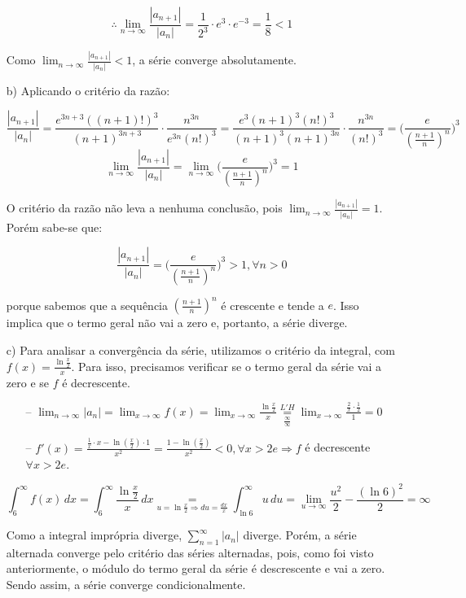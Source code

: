 \documentclass[12pt,a4paper]{article}
\begin{document}
\begin{itemize}
$$\therefore \lim_{n\rightarrow\infty} \frac{|a_{n+1}|}{|a_n|} = \frac{1}{2^3} \cdot e^3 \cdot e^{-3} = \frac{1}{8} < 1 $$

Como $\displaystyle\lim_{n\rightarrow\infty} \frac{|a_{n+1}|}{|a_n|} < 1$, a série converge absolutamente.

\item[b)] Aplicando o critério da razão:

$$ \frac{|a_{n+1}|}{|a_n|} =  \frac{e^{3n+3}((n+1)!)^3}{(n+1)^{3n+3}} \cdot  \frac{n^{3n}}{e^{3n} (n!)^3} =  \frac{e^{3}(n+1)^3 (n!)^3}{(n+1)^{3} (n+1)^{3n}} \cdot  \frac{n^{3n}}{ (n!)^3} = \Bigg( \frac{e}{(\frac{n+1}{n})^n} \Bigg)^3 $$
$$\lim_{n\rightarrow\infty} \frac{|a_{n+1}|}{|a_n|} = \lim_{n\rightarrow\infty} \Bigg( \frac{e}{(\frac{n+1}{n})^n} \Bigg)^3 = 1 $$

O critério da razão não leva a nenhuma conclusão, pois $\displaystyle\lim_{n\rightarrow\infty} \frac{|a_{n+1}|}{|a_n|} = 1 $. Porém sabe-se que:

$$ \frac{|a_{n+1}|}{|a_n|} = \Bigg( \frac{e}{(\frac{n+1}{n})^n} \Bigg)^3 > 1, \forall n > 0 $$

porque sabemos que a sequência $(\frac{n+1}{n})^n$ é crescente e tende a $e$. Isso implica que o termo geral não vai a zero e, portanto, a série diverge.

\item[c)] Para analisar a convergência da série, utilizamos o critério da integral, com $f(x) = \frac{\ln \frac{x}{2}}{x}$. Para isso, precisamos verificar se o termo geral da série vai a zero e se $f$ é decrescente.
    
    \begin{itemize}
    \item[--] $\displaystyle\lim_{n \rightarrow \infty} |a_n| = \lim_{x \rightarrow \infty} f(x) = \lim_{x \rightarrow \infty} \frac{\ln \frac{x}{2}}{x} \underset{\frac{\infty}{\infty}}{ \overset{L'H}{=}} \lim_{x \rightarrow \infty} \frac{\frac{2}{x} \cdot \frac{1}{2}}{1} = 0$
    \item[--] $f'(x) = \frac{\frac{1}{x} \cdot x - \ln(\frac{x}{2}) \cdot 1}{x^2} = \frac{1 - \ln(\frac{x}{2})}{x^2} < 0, \forall x > 2e  \Rightarrow f$ é decrescente $\forall x > 2e$.
    \end{itemize}
    
    $$ \int_{6}^\infty f(x) \, dx = \int_{6}^\infty \frac{\ln \frac{x}{2}}{x}  \, dx \underset{u = \ln \frac{x}{2} \Rightarrow du = \frac{dx}{x} }{=} \int_{\ln 6}^\infty u  \, du = \lim_{u\rightarrow\infty} \frac{u^2}{2} - \frac{(\ln 6)^2}{2} = \infty $$
    
    Como a integral imprópria diverge, $\displaystyle\sum_{n=1}^\infty |a_n|$ diverge. Porém, a série alternada converge pelo critério das séries alternadas, pois, como foi visto anteriormente, o módulo do termo geral da série é descrescente e vai a zero. Sendo assim, a série converge condicionalmente.

\end{itemize}
\end{document}
